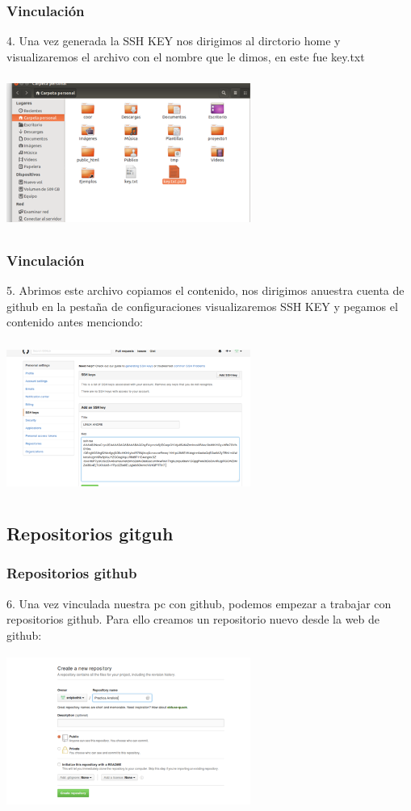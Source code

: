 \documentclass{beamer}
\begin{document}
	\begin{frame}
		\frametitle{Vinculación}
		4. Una vez generada la SSH KEY nos dirigimos al dirctorio home y visualizaremos el archivo con el nombre que le dimos, en este fue key.txt
		\begin{center}\includegraphics[width=8cm, height=5cm]{5.png}\end{center}
	\end{frame}
	\begin{frame}
		\frametitle{Vinculación}
		{\small 5. Abrimos este archivo copiamos el contenido, nos dirigimos anuestra cuenta de github en la pestaña de configuraciones visualizaremos SSH KEY y pegamos el contenido antes menciondo:}
		\begin{center}\includegraphics[width=8cm, height=5cm]{6.png}\end{center}
	\end{frame}

\subsection{Repositorios gitguh}
	\begin{frame}
		\frametitle{Repositorios github}
		{\small 6. Una vez vinculada nuestra pc con github, podemos empezar a trabajar con repositorios github. Para ello creamos un repositorio nuevo desde la web de github:}
		\begin{center}\includegraphics[width=8cm, height=5cm]{7.png}\end{center}
	\end{frame}
	
\end{document}
